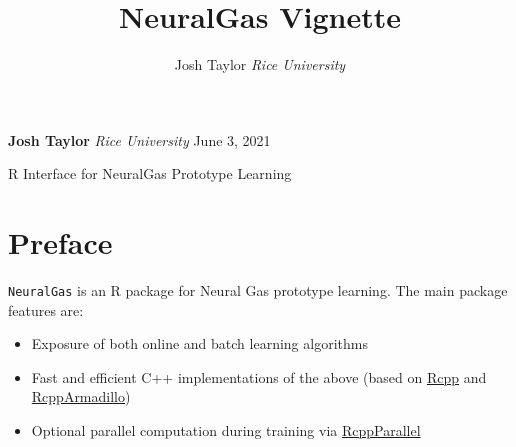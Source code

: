 \documentclass[11pt,]{article}
\title{NeuralGas Vignette  }
\author{\Large Josh Taylor\vspace{0.05in} \newline\normalsize\emph{Rice University}  }
\date{}
\newcommand*{\authorfont}{\fontfamily{phv}\selectfont}
\renewenvironment{abstract}
 {{%
    \setlength{\leftmargin}{0mm}
    \setlength{\rightmargin}{\leftmargin}%
  }%
  \relax}
 {\endlist}
\providecommand{\tightlist}{%
\setlength{\itemsep}{0pt}\setlength{\parskip}{0pt}}
\begin{document}
	
%

{%
\setlength{\parindent}{0pt}
\thispagestyle{plain}
{\fontsize{18}{20}\selectfont\raggedright 
\maketitle  %

}

{
   \vskip 13.5pt\relax \normalsize\fontsize{11}{12} 

\textbf{\authorfont Josh Taylor} \hfill \emph{\small Rice University} \hfill June 3, 2021  

}

}








\begin{abstract}

    \hbox{\vrule height .2pt width 39.14pc}


\noindent R Interface for NeuralGas Prototype Learning


    \hbox{\vrule height .2pt width 39.14pc}


\end{abstract}


\vskip -8.5pt

{
\hypersetup{linkcolor=black}
\setcounter{tocdepth}{2}
\tableofcontents
}


\noindent \onehalfspacing 

\hypertarget{preface}{%
\section*{Preface}\label{preface}}

\texttt{NeuralGas} is an R package for Neural Gas prototype learning.
The main package features are:

\begin{itemize}
\tightlist
\item
  Exposure of both online and batch learning algorithms
\item
  Fast and efficient C++ implementations of the above (based on
  \href{https://cran.r-project.org/web/packages/Rcpp/index.html}{Rcpp}
  and
  \href{https://cran.r-project.org/web/packages/RcppArmadillo/index.html}{RcppArmadillo})
\item
  Optional parallel computation during training via
  \href{https://cran.r-project.org/web/packages/RcppParallel/index.html}{RcppParallel}
\end{itemize}
\end{document}
